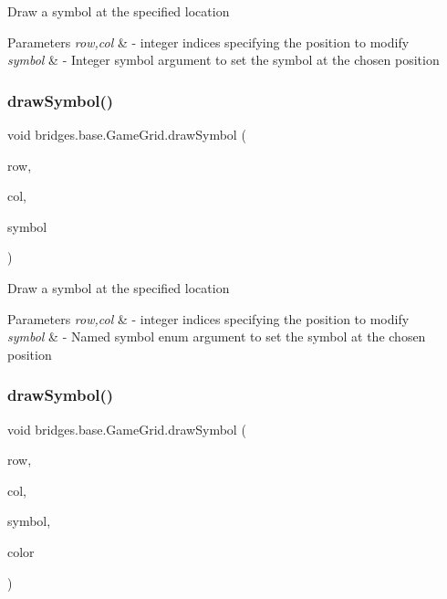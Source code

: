 Draw a symbol at the specified location 
\begin{DoxyParams}{Parameters}
{\em row,col} & -\/ integer indices specifying the position to modify \\
\hline
{\em symbol} & -\/ Integer symbol argument to set the symbol at the chosen position \\
\hline
\end{DoxyParams}
\mbox{\label{classbridges_1_1base_1_1_game_grid_a8e8f99d386149e9cd888dd9e6796e5e0}} 
\subsubsection{\texorpdfstring{draw\+Symbol()}{drawSymbol()}\hspace{0.1cm}{\footnotesize\ttfamily [2/6]}}
{\footnotesize\ttfamily void bridges.\+base.\+Game\+Grid.\+draw\+Symbol (\begin{DoxyParamCaption}\item[{Integer}]{row,  }\item[{Integer}]{col,  }\item[{\hyperlink{enumbridges_1_1base_1_1_named_symbol}{Named\+Symbol}}]{symbol }\end{DoxyParamCaption})}

Draw a symbol at the specified location 
\begin{DoxyParams}{Parameters}
{\em row,col} & -\/ integer indices specifying the position to modify \\
\hline
{\em symbol} & -\/ Named symbol enum argument to set the symbol at the chosen position \\
\hline
\end{DoxyParams}
\mbox{\label{classbridges_1_1base_1_1_game_grid_a89a27cff9fd390f6d824b7e71534b256}} 
\subsubsection{\texorpdfstring{draw\+Symbol()}{drawSymbol()}\hspace{0.1cm}{\footnotesize\ttfamily [3/6]}}
{\footnotesize\ttfamily void bridges.\+base.\+Game\+Grid.\+draw\+Symbol (\begin{DoxyParamCaption}\item[{Integer}]{row,  }\item[{Integer}]{col,  }\item[{Integer}]{symbol,  }\item[{String}]{color }\end{DoxyParamCaption})}

